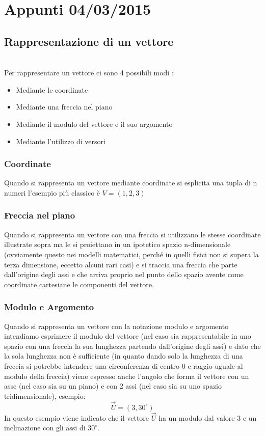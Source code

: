 \documentclass[fontsize = 20px, paper = a4]{article}
\begin{document}
\section{Appunti 04/03/2015}
\subsection{Rappresentazione di un vettore}
\hspace*{5cm} \\
Per rappresentare un vettore ci sono 4 possibili modi : 
\begin{itemize}
\item Mediante le coordinate
\item Mediante una freccia nel piano
\item Mediante il modulo del vettore e il suo argomento
\item Mediante l'utilizzo di versori
\end{itemize}
\subsubsection{Coordinate}
Quando si rappresenta un vettore mediante coordinate si esplicita una tupla di n numeri l'esempio più classico è $V = (1,2,3)$ \newpage
\subsubsection{Freccia nel piano}
Quando si rappresenta un vettore con una freccia si utilizzano le stesse coordinate illustrate sopra ma le si proiettano in un ipotetico spazio n-dimensionale (ovviamente questo nei modelli matematici, perché in quelli fisici non si supera la terza dimensione, eccetto alcuni rari casi) e si traccia una freccia che parte dall'origine degli assi e che arriva proprio nel punto dello spazio avente come coordinate cartesiane le componenti del vettore. \\ 
\subsubsection{Modulo e Argomento}
Quando si rappresenta un vettore con la notazione modulo e argomento intendiamo esprimere il modulo del vettore (nel caso sia rappresentabile in uno spazio con una freccia la sua lunghezza partendo dall'origine degli assi) e dato che la sola lunghezza non è sufficiente (in quanto dando solo la lunghezza di una freccia si potrebbe intendere una circonferenza di centro 0 e raggio uguale al modulo della freccia) viene espresso anche l'angolo che forma il vettore con un asse (nel caso sia su un piano) e con 2 assi (nel caso sia su uno spazio tridimensionale), esempio:
$$\overrightarrow{U} = (3,30^\circ)$$
In questo esempio viene indicato che il vettore $\overrightarrow{U}$ ha un modulo dal valore 3 e un inclinazione con gli assi di $30^\circ$. \\ 
\end{document}

